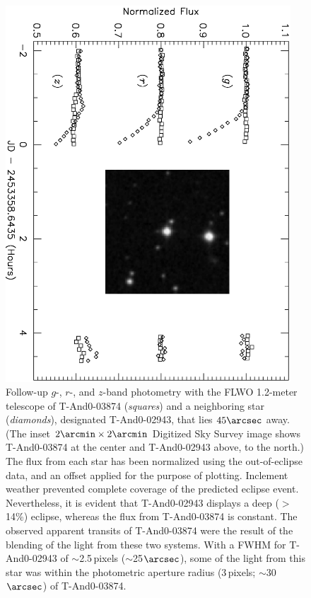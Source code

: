 \begin{figure}
\begin{center}
\includegraphics[angle=90, width=0.95\textwidth]{2_f6}
\caption[Follow-up photometry of \mbox{T-And0-03874}, a blended eclipsing binary]{
Follow-up $g$-, $r$-, and $z$-band photometry with the FLWO 1.2-meter telescope of \mbox{T-And0-03874} (\textit{squares}) and a neighboring star (\textit{diamonds}), designated \mbox{T-And0-02943}, that lies $45\arcsec$ away. (The inset $2\arcmin \times 2\arcmin$ Digitized Sky Survey image shows \mbox{T-And0-03874} at the center and \mbox{T-And0-02943} above, to the north.) %
The flux from each star has been normalized using the out-of-eclipse data, and an offset  applied for the purpose of plotting. Inclement weather prevented complete coverage of the predicted eclipse event. Nevertheless, it is evident that \mbox{T-And0-02943} displays a deep ($>$14\%) eclipse, whereas the flux from \mbox{T-And0-03874} is constant. The observed apparent transits of \mbox{T-And0-03874} were the result of the blending of the light from these two systems. With a FWHM for \mbox{T-And0-02943} of $\sim$2.5\,pixels ($\sim$25$\arcsec$), some of the light from this star was within the photometric aperture radius ($3$\,pixels; $\sim$30$\arcsec$) of \mbox{T-And0-03874}.}
\label{cha:and0:fig:blend}
\end{center}
\end{figure}

